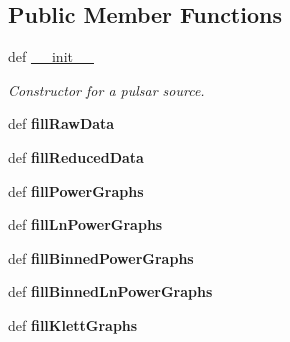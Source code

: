 \subsection*{Public Member Functions}
\begin{DoxyCompactItemize}
\item 
def \hyperlink{classpLidarRunPlotter_1_1pLidarRunPlotter_aa7c1da9fb5a9a40bd906bc5cfb7f2a05}{\-\_\-\-\_\-init\-\_\-\-\_\-}
\begin{DoxyCompactList}\small\item\em Constructor for a pulsar source. \end{DoxyCompactList}\item 
\hypertarget{classpLidarRunPlotter_1_1pLidarRunPlotter_a19b05276bf9a374852923bbddd7a8176}{def {\bfseries fill\-Raw\-Data}}\label{classpLidarRunPlotter_1_1pLidarRunPlotter_a19b05276bf9a374852923bbddd7a8176}

\item 
\hypertarget{classpLidarRunPlotter_1_1pLidarRunPlotter_add0c52ed8c1e7724cd13738c81f3497f}{def {\bfseries fill\-Reduced\-Data}}\label{classpLidarRunPlotter_1_1pLidarRunPlotter_add0c52ed8c1e7724cd13738c81f3497f}

\item 
\hypertarget{classpLidarRunPlotter_1_1pLidarRunPlotter_a995d9a64e5f88b365cf02d96e8451e5b}{def {\bfseries fill\-Power\-Graphs}}\label{classpLidarRunPlotter_1_1pLidarRunPlotter_a995d9a64e5f88b365cf02d96e8451e5b}

\item 
\hypertarget{classpLidarRunPlotter_1_1pLidarRunPlotter_a7f781ecc2248c58547d10237940912ce}{def {\bfseries fill\-Ln\-Power\-Graphs}}\label{classpLidarRunPlotter_1_1pLidarRunPlotter_a7f781ecc2248c58547d10237940912ce}

\item 
\hypertarget{classpLidarRunPlotter_1_1pLidarRunPlotter_a396645d4e2ea2b850db1660501c99f16}{def {\bfseries fill\-Binned\-Power\-Graphs}}\label{classpLidarRunPlotter_1_1pLidarRunPlotter_a396645d4e2ea2b850db1660501c99f16}

\item 
\hypertarget{classpLidarRunPlotter_1_1pLidarRunPlotter_a80601d4a34a3fcd2b757d52c45480970}{def {\bfseries fill\-Binned\-Ln\-Power\-Graphs}}\label{classpLidarRunPlotter_1_1pLidarRunPlotter_a80601d4a34a3fcd2b757d52c45480970}

\item 
\hypertarget{classpLidarRunPlotter_1_1pLidarRunPlotter_a926b4db7270c22f58477073b0d057550}{def {\bfseries fill\-Klett\-Graphs}}\label{classpLidarRunPlotter_1_1pLidarRunPlotter_a926b4db7270c22f58477073b0d057550}


\end{DoxyCompactItemize}
